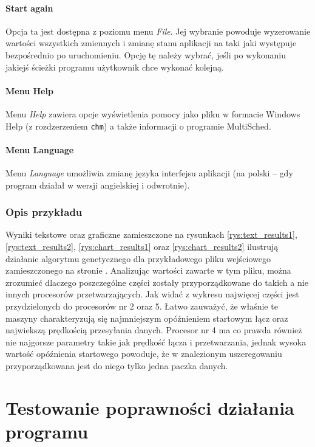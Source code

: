 \subsubsection*{Start again}

Opcja ta jest dostępna z poziomu menu \emph{File}. Jej wybranie powoduje wyzerowanie wartości wszystkich zmiennych i zmianę stanu aplikacji na 
taki jaki występuje bezpośrednio po uruchomieniu. Opcję tę należy wybrać, jeśli po wykonaniu jakiejś ścieżki programu użytkownik chce wykonać 
kolejną.

\subsubsection*{Menu Help}
Menu \emph{Help} zawiera opcje wyświetlenia pomocy jako pliku w formacie Windows Help (z rozdzerzeniem \texttt{chm}) a także informacji 
o programie MultiSched.

\subsubsection*{Menu Language}
Menu \emph{Language} umożliwia zmianę języka interfejsu aplikacji (na polski -- gdy program działał w wersji angielskiej i odwrotnie).

\subsection{Opis przykładu}

Wyniki tekstowe oraz graficzne zamieszczone na rysunkach \vref{rys:text_results1}, \vref{rys:text_results2}, \vref{rys:chart_results1} oraz 
\vref{rys:chart_results2} ilustrują działanie algorytmu genetycznego dla przykładowego pliku wejściowego zamieszczonego na stronie \pageref{lst1}. 
Analizując wartości zawarte w tym pliku, można zrozumieć dlaczego poszczególne części zostały przyporządkowane do takich a nie innych procesorów 
przetwarzających. Jak widać z wykresu najwięcej części jest przydzielonych do procesorów nr 2 oraz 5. Łatwo zauważyć, że właśnie te maszyny charakteryzują 
się najmniejszym opóźnieniem startowym łącz oraz najwiekszą prędkością przesyłania danych. Procesor nr 4 ma co prawda również nie najgorsze parametry 
takie jak prędkość łącza i przetwarzania, jednak wysoka wartość opóźnienia startowego powoduje, że w znalezionym uszeregowaniu przyporządkowana 
jest do niego tylko jedna paczka danych.

\chapter{Testowanie poprawności działania programu}

